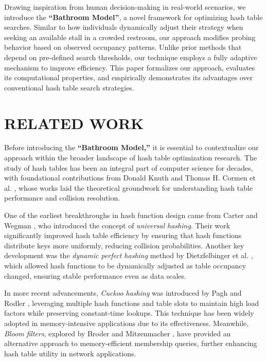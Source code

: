\documentclass[letterpaper]{article}
\begin{document}
Drawing inspiration from human decision-making in real-world scenarios, we introduce the \textbf{``Bathroom Model''}, a novel framework for optimizing hash table searches. Similar to how individuals dynamically adjust their strategy when seeking an available stall in a crowded restroom, our approach modifies probing behavior based on observed occupancy patterns. Unlike prior methods that depend on pre-defined search thresholds, our technique employs a fully adaptive mechanism to improve efficiency. This paper formalizes our approach, evaluates its computational properties, and empirically demonstrates its advantages over conventional hash table search strategies.

\section{RELATED WORK}

Before introducing the \textbf{``Bathroom Model,''} it is essential to contextualize our approach within the broader landscape of hash table optimization research. The study of hash tables has been an integral part of computer science for decades, with foundational contributions from Donald Knuth \cite{knuth1998} and Thomas H. Cormen et al. \cite{cormen2009}, whose works laid the theoretical groundwork for understanding hash table performance and collision resolution.

One of the earliest breakthroughs in hash function design came from Carter and Wegman \cite{carter1977}, who introduced the concept of \textit{universal hashing}. Their work significantly improved hash table efficiency by ensuring that hash functions distribute keys more uniformly, reducing collision probabilities. Another key development was the \textit{dynamic perfect hashing} method by Dietzfelbinger et al. \cite{dietzfelbinger1990}, which allowed hash functions to be dynamically adjusted as table occupancy changed, ensuring stable performance even as data scales.

In more recent advancements, \textit{Cuckoo hashing} was introduced by Pagh and Rodler \cite{pagh2004}, leveraging multiple hash functions and table slots to maintain high load factors while preserving constant-time lookups. This technique has been widely adopted in memory-intensive applications due to its effectiveness. Meanwhile, \textit{Bloom filters}, explored by Broder and Mitzenmacher \cite{broder2003}, have provided an alternative approach to memory-efficient membership queries, further enhancing hash table utility in network applications.
\end{document}
